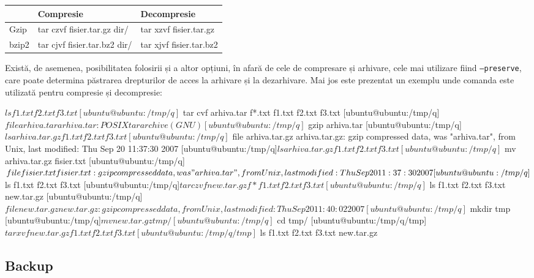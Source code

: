 \begin{table}[htb]
\begin{center}
	\begin{tabular}{ | p{} | p{} |  p{} |}
	\hline
	 & \textbf{Compresie} & \textbf{Decompresie} \\
	\hline
		Gzip & tar czvf fisier.tar.gz dir/ & tar xzvf fisier.tar.gz \\
	\hline
		bzip2 & tar cjvf fisier.tar.bz2 dir/ & tar xjvf fisier.tar.bz2 \\
	\hline
	\end{tabular}
	\label{table:exemple-arhivare}
\end{center}
\end{table}

Există, de asemenea, posibilitatea folosirii și a altor opțiuni, în afară de
cele de compresare și arhivare, cele mai utilizare fiind \texttt{--preserve},
care poate determina păstrarea drepturilor de acces la arhivare și la
dezarhivare. Mai jos este prezentat un exemplu unde comanda  este
utilizată pentru compresie și decompresie:

\begin{screen}
$ ls
f1.txt  f2.txt  f3.txt
[ubuntu@ubuntu:/tmp/q]$ tar cvf arhiva.tar f*.txt
f1.txt
f2.txt
f3.txt
[ubuntu@ubuntu:/tmp/q]$ file arhiva.tar
arhiva.tar: POSIX tar archive (GNU)
[ubuntu@ubuntu:/tmp/q]$ gzip arhiva.tar
[ubuntu@ubuntu:/tmp/q]$ ls
arhiva.tar.gz  f1.txt  f2.txt  f3.txt
[ubuntu@ubuntu:/tmp/q]$ file arhiva.tar.gz
arhiva.tar.gz: gzip compressed data, was "arhiva.tar", from Unix, last modified: Thu Sep 20 11:37:30 2007
[ubuntu@ubuntu:/tmp/q]$ ls
arhiva.tar.gz  f1.txt  f2.txt  f3.txt
[ubuntu@ubuntu:/tmp/q]$ mv arhiva.tar.gz fisier.txt
[ubuntu@ubuntu:/tmp/q]$ file fisier.txt
fisier.txt: gzip compressed data, was "arhiva.tar", from Unix, last modified: Thu Sep 20 11:37:30 2007
[ubuntu@ubuntu:/tmp/q]$ ls
f1.txt  f2.txt  f3.txt
[ubuntu@ubuntu:/tmp/q]$ tar czvf new.tar.gz f*
f1.txt
f2.txt
f3.txt
[ubuntu@ubuntu:/tmp/q]$ ls
f1.txt  f2.txt  f3.txt  new.tar.gz
[ubuntu@ubuntu:/tmp/q]$ file new.tar.gz
new.tar.gz: gzip compressed data, from Unix, last modified: Thu Sep 20 11:40:02 2007
[ubuntu@ubuntu:/tmp/q]$ mkdir tmp
[ubuntu@ubuntu:/tmp/q]$ mv new.tar.gz tmp/
[ubuntu@ubuntu:/tmp/q]$ cd tmp/
[ubuntu@ubuntu:/tmp/q/tmp]$ tar xvf new.tar.gz
f1.txt
f2.txt
f3.txt
[ubuntu@ubuntu:/tmp/q/tmp]$ ls
f1.txt  f2.txt  f3.txt  new.tar.gz
\end{screen}

\subsection{Backup}


